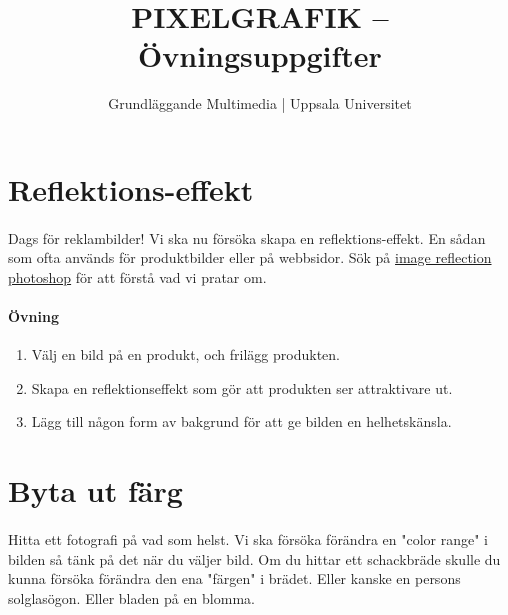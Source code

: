 \documentclass{article}
\begin{document}
  \title{ PIXELGRAFIK -- Övningsuppgifter }
  \author{ Grundläggande Multimedia | Uppsala Universitet }
  \date{}
  \maketitle


  \section{ Reflektions-effekt }
    \paragraph{}
    Dags för reklambilder! Vi ska nu försöka skapa en reflektions-effekt. En sådan som ofta används för produktbilder eller på webbsidor. Sök på \href{https://www.google.se/search?q=engraved+text+photoshop&um=1&ie=UTF-8&hl=sv&tbm=isch&source=og&sa=N&tab=wi&ei=xK4lUsD7DNSQhQep94CYBQ&biw=1280&bih=679&sei=xq4lUuefCMGJhQfghYCoAw#hl=sv&q=image+reflection+photoshop&tbm=isch&um=1}{image reflection photoshop} för att förstå vad vi pratar om.

    \paragraph{ Övning }
      \begin{enumerate}
        \item Välj en bild på en produkt, och frilägg produkten.
        \item Skapa en reflektionseffekt som gör att produkten ser attraktivare ut.
        \item Lägg till någon form av bakgrund för att ge bilden en helhetskänsla.
      \end{enumerate}



  \section{Byta ut färg}
    \paragraph{}
    Hitta ett fotografi på vad som helst. Vi ska försöka förändra en "color range" i bilden så tänk på det när du väljer bild. Om du hittar ett schackbräde skulle du kunna försöka förändra den ena "färgen" i brädet. Eller kanske en persons solglasögon. Eller bladen på en blomma.
\end{document}
